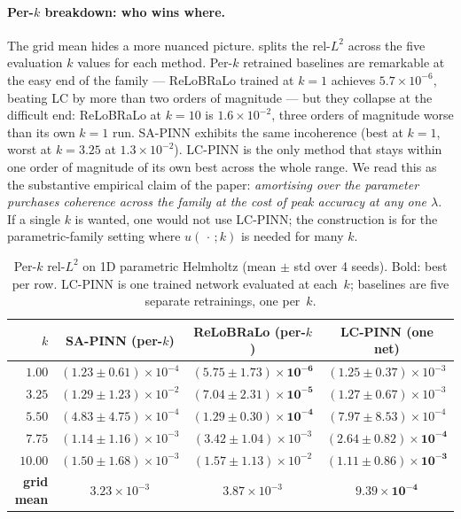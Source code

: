 \documentclass{article}
\theoremstyle{plain}
\theoremstyle{definition}
\theoremstyle{remark}
\begin{document}
\paragraph{Per-$k$ breakdown: who wins where.}
The grid mean hides a more nuanced picture. 
splits the rel-$L^2$ across the five evaluation $k$ values for each
method. Per-$k$ retrained baselines are remarkable at the easy end
of the family --- ReLoBRaLo trained at $k\!=\!1$ achieves
$5.7\!\times\!10^{-6}$, beating LC by more than two orders of
magnitude --- but they collapse at the difficult end: ReLoBRaLo at
$k\!=\!10$ is $1.6\!\times\!10^{-2}$, three orders of magnitude
worse than its own $k\!=\!1$ run. SA-PINN exhibits the same
incoherence (best at $k\!=\!1$, worst at $k\!=\!3.25$ at
$1.3\!\times\!10^{-2}$). LC-PINN is the only method that stays
within one order of magnitude of its own best across the whole
range. We read this as the substantive empirical claim of the
paper: \emph{amortising over the parameter purchases coherence
across the family at the cost of peak accuracy at any one
$\lambda$}. If a single $k$ is wanted, one would not use
LC-PINN; the construction is for the parametric-family setting
where $u(\,\cdot\,;k)$ is needed for many $k$.

\begin{table}[h]
\centering
\caption{Per-$k$ rel-$L^2$ on 1D parametric Helmholtz (mean $\pm$ std
over 4 seeds). Bold: best per row. LC-PINN is one trained network
evaluated at each~$k$; baselines are five separate retrainings, one
per~$k$.}
\label{tab:helm-per-k}
\small
\begin{tabular}{r|ccc}
\toprule
$k$ & SA-PINN (per-$k$) & ReLoBRaLo (per-$k$) & LC-PINN (one net) \\
\midrule
$1.00$  & $(1.23\!\pm\!0.61)\!\times\!10^{-4}$  & $\mathbf{(5.75\!\pm\!1.73)\!\times\!10^{-6}}$ & $(1.25\!\pm\!0.37)\!\times\!10^{-3}$ \\
$3.25$  & $(1.29\!\pm\!1.23)\!\times\!10^{-2}$  & $\mathbf{(7.04\!\pm\!2.31)\!\times\!10^{-5}}$ & $(1.27\!\pm\!0.67)\!\times\!10^{-3}$ \\
$5.50$  & $(4.83\!\pm\!4.75)\!\times\!10^{-4}$  & $\mathbf{(1.29\!\pm\!0.30)\!\times\!10^{-4}}$ & $(7.97\!\pm\!8.53)\!\times\!10^{-4}$ \\
$7.75$  & $(1.14\!\pm\!1.16)\!\times\!10^{-3}$  & $(3.42\!\pm\!1.04)\!\times\!10^{-3}$ & $\mathbf{(2.64\!\pm\!0.82)\!\times\!10^{-4}}$ \\
$10.00$ & $(1.50\!\pm\!1.68)\!\times\!10^{-3}$  & $(1.57\!\pm\!1.13)\!\times\!10^{-2}$ & $\mathbf{(1.11\!\pm\!0.86)\!\times\!10^{-3}}$ \\
\midrule
\textbf{grid mean} & $3.23\!\times\!10^{-3}$ & $3.87\!\times\!10^{-3}$ & $\mathbf{9.39\!\times\!10^{-4}}$ \\
\bottomrule
\end{tabular}
\end{table}
\end{document}
